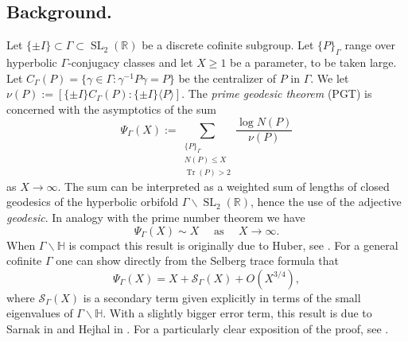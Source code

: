 \documentclass{article}
\theoremstyle{named}
\renewcommand{\S}{\mathcal{S}}
\newcommand{\Hyp}{\mathbb{H}}
\newcommand{\R}{\mathbb{R}}
\newcommand{\N}{\mathcal{N}}
\DeclareMathOperator{\SL}{SL}
\DeclareMathOperator{\Tr}{Tr}
\begin{document}
\subsection{Background.}
Let $\{\pm I\} \subset \Gamma \subset \SL_2(\R)$ be a discrete cofinite subgroup. Let $\{P\}_{\Gamma}$ range over hyperbolic $\Gamma$-conjugacy classes and let $X \geq 1$ be a parameter, to be taken large. Let $C_\Gamma(P) = \{\gamma \in \Gamma : \gamma^{-1}P\gamma = P\}$ be the centralizer of $P$ in $\Gamma$. We let $\nu(P) := [\{\pm I\}C_\Gamma(P): \{\pm I\}\langle P\rangle]$. The \emph{prime geodesic theorem} (PGT) is concerned with the asymptotics of the sum
\begin{equation}\label{eq:defiofprimegeodesicsum}
    \Psi_{\Gamma}(X) := \sum_{\substack{\{P\}_{\Gamma}\\N(P)\leq X\\
    \Tr(P) > 2}}\frac{\log N(P)}{\nu(P)}
\end{equation}
as $X \to \infty$. The sum can be interpreted as a weighted sum of lengths of closed geodesics of the hyperbolic orbifold $\Gamma\backslash \SL_2(\R)$, hence the use of the adjective \emph{geodesic}. In analogy with the prime number theorem we have 
\begin{equation}\label{eq:weakprimegeodesic}
\Psi_\Gamma(X) \sim X \quad \text{ as }\quad X \to \infty.
\end{equation}
When $\Gamma\backslash \Hyp$ is compact this result is originally due to Huber, see \cite[Satz 9]{huberI}. For a general cofinite $\Gamma$ one can show directly from the Selberg trace formula that
\begin{equation}\label{eq:basicprimegeodesic}
\Psi_\Gamma(X) = X + \S_\Gamma(X) + O(X^{3/4}),
\end{equation}
where $\S_\Gamma(X)$ is a secondary term given explicitly in terms of the small eigenvalues of $\Gamma\backslash \Hyp$. With a slightly bigger error term, this result is due to Sarnak in \cite[Theorem 3.16]{sarnakthesis} and Hejhal in \cite[Chapter 10, Theorem 3.4]{hejhal2}. For a particularly clear exposition of the proof, see \cite[Theorem 10.5]{iwaniec}.
\end{document}
